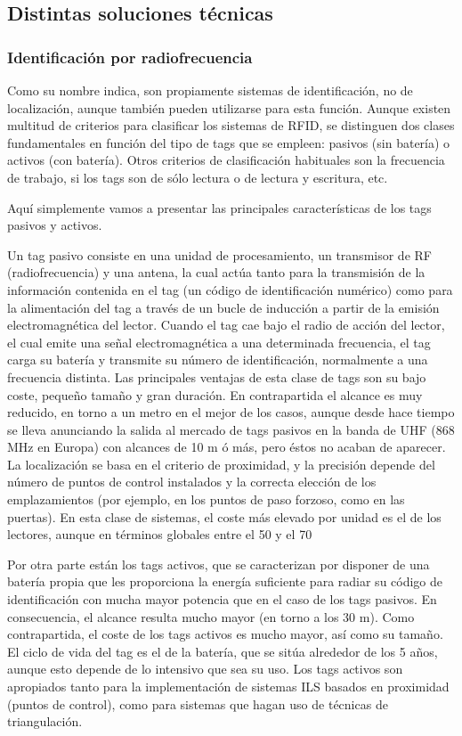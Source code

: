 \subsection{Distintas soluciones técnicas}

\subsubsection{Identificación por radiofrecuencia}

Como su nombre indica, son propiamente sistemas de identificación, no de localización, aunque también pueden utilizarse para esta función. Aunque existen multitud de criterios para clasificar los sistemas de RFID, se distinguen dos clases fundamentales en función del tipo de tags que se empleen: pasivos (sin batería) o activos (con batería). Otros criterios de clasificación habituales son la frecuencia de trabajo, si los tags son de sólo lectura o de lectura y escritura, etc. 

Aquí simplemente vamos a presentar las principales características de los tags pasivos y activos. 

Un tag pasivo consiste en una unidad de procesamiento, un transmisor de RF (radiofrecuencia)
y una antena, la cual actúa tanto para la transmisión de la información contenida en el tag (un código de identificación
numérico) como para la alimentación del tag a través de un bucle de inducción a partir de la emisión electromagnética del lector. Cuando el tag cae bajo el radio de acción del lector, el cual emite una señal electromagnética a una determinada frecuencia, el tag carga su batería y transmite su número de identificación, normalmente a una frecuencia distinta. Las principales ventajas de esta clase de tags son su bajo coste, pequeño tamaño y gran duración. En contrapartida el alcance es muy reducido, en torno a un metro en el mejor de los casos, aunque desde hace tiempo se lleva anunciando la salida al mercado de tags pasivos en la banda de UHF (868 MHz en Europa) con alcances de 10 m ó más, pero éstos no acaban de aparecer. La localización se basa en el criterio de proximidad, y la precisión depende del número de puntos de control instalados y la correcta elección de los emplazamientos (por ejemplo, en los puntos de paso forzoso, como en las puertas). En esta clase de sistemas, el coste más elevado por unidad es el de los lectores, aunque en términos globales entre el 50 y el 70%

Por otra parte están los tags activos, que se caracterizan por disponer de una batería propia que les proporciona la energía suficiente para radiar su código de identificación con mucha mayor potencia que en el caso de los tags pasivos. En consecuencia, el alcance resulta mucho mayor (en torno a los 30 m). Como contrapartida, el coste de los tags activos es mucho mayor, así como su tamaño. El ciclo de vida del tag es el de la batería, que se sitúa alrededor de los 5 años, aunque esto depende de lo intensivo que sea su uso. Los tags activos son apropiados tanto para la implementación de sistemas ILS basados en proximidad (puntos de control), como para sistemas que hagan uso de técnicas de triangulación. 

